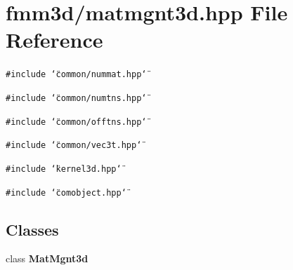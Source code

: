 \section{fmm3d/matmgnt3d.hpp File Reference}
\label{matmgnt3d_8hpp}


{\tt \#include \char`\"{}common/nummat.hpp\char`\"{}}\par
{\tt \#include \char`\"{}common/numtns.hpp\char`\"{}}\par
{\tt \#include \char`\"{}common/offtns.hpp\char`\"{}}\par
{\tt \#include \char`\"{}common/vec3t.hpp\char`\"{}}\par
{\tt \#include \char`\"{}kernel3d.hpp\char`\"{}}\par
{\tt \#include \char`\"{}comobject.hpp\char`\"{}}\par
\subsection*{Classes}
\begin{CompactItemize}
\item 
class {\bf Mat\-Mgnt3d}
\end{CompactItemize}
